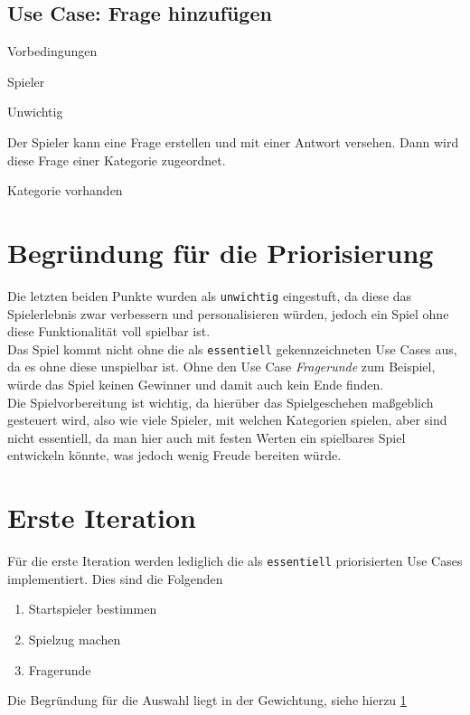 \subsection{Use Case: Frage hinzufügen}
\begin{labeling}[:]{Vorbedingungen}
\item [Akteure] Spieler
\item [Priorität] Unwichtig
\item [Beschreibung] Der Spieler kann eine Frage erstellen und mit einer Antwort versehen. Dann wird diese Frage einer Kategorie zugeordnet.
\item [Vorbedingungen] Kategorie vorhanden
\item [Offene Punkte]
\end{labeling}

\section{Begründung für die Priorisierung}\label{sec:begruendung-prio}
Die letzten beiden Punkte wurden als \texttt{unwichtig} eingestuft, da diese das Spielerlebnis zwar verbessern und personalisieren würden, jedoch ein Spiel ohne diese Funktionalität voll spielbar ist.\\
Das Spiel kommt nicht ohne die als \texttt{essentiell} gekennzeichneten Use Cases aus, da es ohne diese unspielbar ist. Ohne den Use Case \emph{Fragerunde} zum Beispiel, würde das Spiel keinen Gewinner und damit auch kein Ende finden.\\
Die Spielvorbereitung ist wichtig, da hierüber das Spielgeschehen maßgeblich gesteuert wird, also wie viele Spieler, mit welchen Kategorien spielen, aber sind nicht essentiell, da man hier auch mit festen Werten ein spielbares Spiel entwickeln könnte, was jedoch wenig Freude bereiten würde.

\section{Erste Iteration}
Für die erste Iteration werden lediglich die als \texttt{essentiell} priorisierten Use Cases implementiert. Dies sind die Folgenden

\begin{enumerate}
\item Startspieler bestimmen
\item Spielzug machen
\item Fragerunde
\end{enumerate}

Die Begründung für die Auswahl liegt in der Gewichtung, siehe hierzu \ref{sec:begruendung-prio}
